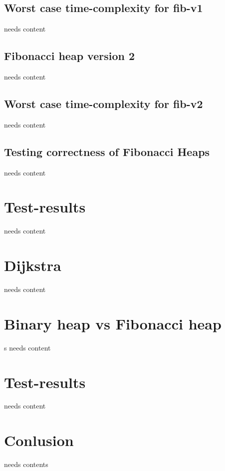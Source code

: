\documentclass[12pt,a4paper,twoside,danish,article]{article}
\begin{document}
\section{Worst case time-complexity for fib-v1}

needs content

\section{Fibonacci heap version 2}

needs content

\section{Worst case time-complexity for fib-v2}

needs content

\section{Testing correctness of Fibonacci Heaps}

needs content

\chapter{Test-results}

needs content

\chapter{Dijkstra}

needs content

\chapter{Binary heap vs Fibonacci heap}
s
needs content

\chapter{Test-results}

needs content

\chapter{Conlusion}

needs contents



\end{document}
